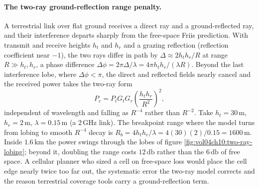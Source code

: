 \paragraph{The two-ray ground-reflection range penalty.}
A terrestrial link over flat ground receives a direct ray and a
ground-reflected ray, and their interference departs sharply from the
free-space Friis prediction. With transmit and receive heights $h_t$ and
$h_r$ and a grazing reflection (reflection coefficient near $-1$), the two
rays differ in path by $\Delta \approx 2 h_t h_r/R$ at range $R\gg h_t,
h_r$, a phase difference $\Delta\phi = 2\pi\Delta/\lambda = 4\pi h_t h_r/
(\lambda R)$. Beyond the last interference lobe, where $\Delta\phi < \pi$,
the direct and reflected fields nearly cancel and the received power takes
the two-ray form
\[
P_r = P_t G_t G_r \left(\frac{h_t h_r}{R^2}\right)^2,
\]
independent of wavelength and falling as $R^{-4}$ rather than $R^{-2}$.
Take $h_t = 30\,\si{\meter}$, $h_r = 2\,\si{\meter}$, $\lambda = 0.15\,\si{
\meter}$ (a $2\,\si{\giga\hertz}$ link). The breakpoint range where the
model turns from lobing to smooth $R^{-4}$ decay is $R_b = 4 h_t h_r/
\lambda = 4(30)(2)/0.15 = 1600\,\si{\meter}$. Inside $1.6\,\si{\kilo\meter}$
the power swings through the lobes of figure
\ref{fig:vol04ch10:two-ray-lobing}; beyond it, doubling the range costs
$12\,\si{\decibel}$ rather than the $6\,\si{\decibel}$ of free space. A
cellular planner who sized a cell on free-space loss would place the cell
edge nearly twice too far out, the systematic error the two-ray model
corrects and the reason terrestrial coverage tools carry a ground-reflection
term.



